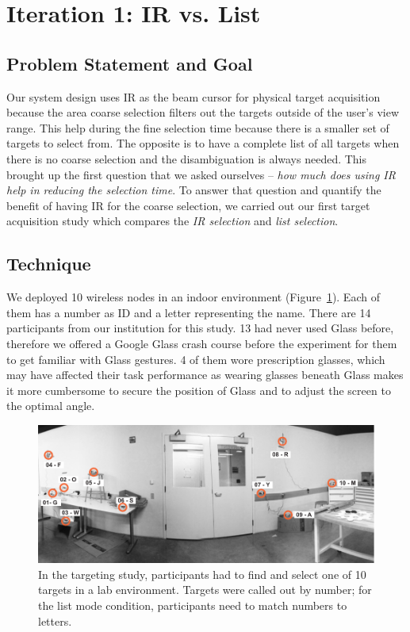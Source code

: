 
\section{Iteration 1: IR vs. List}
\subsection{Problem Statement and Goal}
Our system design uses IR as the beam cursor for physical target acquisition because the area coarse selection filters out the targets outside of the user's view range. This help during the fine selection time because there is a smaller set of targets to select from. The opposite is to have a complete list of all targets when there is no coarse selection and the disambiguation is always needed. This brought up the first question that we asked ourselves -- {\em how much does using IR help in reducing the selection time}. To answer that question and quantify the benefit of having IR for the coarse selection, we carried out our first target acquisition study which compares the {\em IR selection} and {\em list selection}.  

\subsection{Technique}

We deployed 10 wireless nodes in an indoor environment (Figure~\ref{fig:targeting-study-layout}). Each of them has a number as ID and a letter representing the name. There are 14 participants from our institution for this study. 13 had never used Glass before, therefore we offered a Google Glass crash course before the experiment for them to get familiar with Glass gestures. 4 of them wore prescription glasses, which may have affected their task performance as wearing glasses beneath Glass makes it more cumbersome to secure the position of Glass and to adjust the screen to the optimal angle. 

\begin{figure}[t]
\centering
\includegraphics[width=1.0\columnwidth]{figures/targeting-study-layout.pdf}
\caption{In the targeting study, participants had to find and select one of 10 targets in a lab environment. Targets were called out by number; for the list mode condition, participants need to match numbers to letters.}
\label{fig:targeting-study-layout}
\end{figure}

